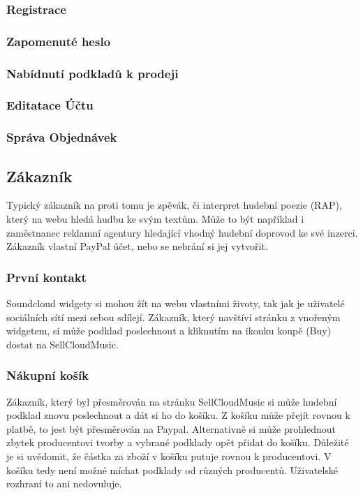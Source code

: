 \documentclass[12pt]{article}
\begin{document}
\subsubsection{Registrace}
\subsubsection{Zapomenuté heslo}
\subsubsection{Nabídnutí podkladů k prodeji}
\subsubsection{Editatace Účtu}
\subsubsection{Správa Objednávek}

\subsection{Zákazník}

Typický zákazník na proti tomu je zpěvák, či interpret hudební poezie (RAP), který na webu hledá hudbu ke svým textům. Může to být například i zaměstnanec reklamní agentury hledající vhodný hudební doprovod ke své inzerci.
Zákazník vlastní PayPal účet, nebo se nebrání si jej vytvořit.

\subsubsection{První kontakt}
Soundcloud widgety si mohou žít na webu vlastními životy, tak jak je uživatelé sociálních sítí mezi sebou sdílejí. Zákazník, který navštíví stránku z vnořeným widgetem, si může podklad poslechnout a kliknutím na ikonku koupě (Buy) dostat na SellCloudMusic.

\subsubsection{Nákupní košík}
Zákazník, který byl přesměrován na stránku SellCloudMusic si může hudební podklad znovu poslechnout a dát si ho do košíku. Z košíku může přejít rovnou k platbě, to jest být přesměrován na Paypal. Alternativně si může prohlednout zbytek producentovi tvorby a vybrané podklady opět přidat do košíku.
Důležité je si uvědomit, že částka za zboží v košíku putuje rovnou k producentovi. V košíku tedy není možné míchat podklady od různých producentů. Uživatelské rozhraní to ani nedovuluje.
\end{document}

